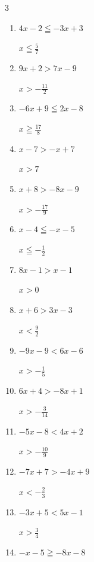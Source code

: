 \begin{multicols}{3}
\begin{enumerate}
        $\displaystyle x>-\frac{13}{14}$

  \item $4x-2\leqq -3x+3$

        $\displaystyle x\leqq \frac{5}{7}$

  \item $9x+2>7x-9$

        $\displaystyle x>-\frac{11}{2}$

  \item $-6x+9\leqq 2x-8$

        $\displaystyle x\geqq \frac{17}{8}$

  \item $x-7>-x+7$

        $\displaystyle x>7$

  \item $x+8>-8x-9$

        $\displaystyle x>-\frac{17}{9}$

  \item $x-4\leqq -x-5$

        $\displaystyle x\leqq -\frac{1}{2}$

  \item $8x-1>x-1$

        $\displaystyle x>0$

\columnbreak %

  \item $x+6>3x-3$

        $\displaystyle x<\frac{9}{2}$

  \item $-9x-9<6x-6$

        $\displaystyle x>-\frac{1}{5}$

  \item $6x+4>-8x+1$

        $\displaystyle x>-\frac{3}{14}$

  \item $-5x-8<4x+2$

        $\displaystyle x>-\frac{10}{9}$

  \item $-7x+7>-4x+9$

        $\displaystyle x<-\frac{2}{3}$

  \item $-3x+5<5x-1$

        $\displaystyle x>\frac{3}{4}$

  \item $-x-5\geqq -8x-8$


\end{enumerate}
\end{multicols}
